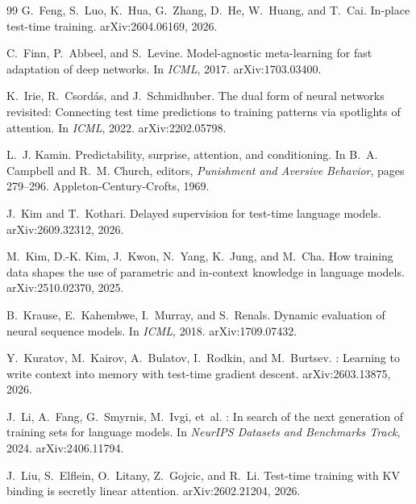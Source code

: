 \documentclass[11pt]{article}
\begin{document}
\begin{thebibliography}{99}
G.~Feng, S.~Luo, K.~Hua, G.~Zhang, D.~He, W.~Huang, and T.~Cai.
\newblock In-place test-time training.
\newblock arXiv:2604.06169, 2026.

C.~Finn, P.~Abbeel, and S.~Levine.
\newblock Model-agnostic meta-learning for fast adaptation of deep networks.
\newblock In \emph{ICML}, 2017. arXiv:1703.03400.

K.~Irie, R.~Csord{\'a}s, and J.~Schmidhuber.
\newblock The dual form of neural networks revisited: Connecting test time predictions to training
  patterns via spotlights of attention.
\newblock In \emph{ICML}, 2022. arXiv:2202.05798.

L.~J. Kamin.
\newblock Predictability, surprise, attention, and conditioning.
\newblock In B.~A. Campbell and R.~M. Church, editors, \emph{Punishment and Aversive Behavior},
  pages 279--296. Appleton-Century-Crofts, 1969.

J.~Kim and T.~Kothari.
\newblock Delayed supervision for test-time language models.
\newblock arXiv:2609.32312, 2026.

M.~Kim, D.-K. Kim, J.~Kwon, N.~Yang, K.~Jung, and M.~Cha.
\newblock How training data shapes the use of parametric and in-context knowledge in language
  models.
\newblock arXiv:2510.02370, 2025.

B.~Krause, E.~Kahembwe, I.~Murray, and S.~Renals.
\newblock Dynamic evaluation of neural sequence models.
\newblock In \emph{ICML}, 2018. arXiv:1709.07432.

Y.~Kuratov, M.~Kairov, A.~Bulatov, I.~Rodkin, and M.~Burtsev.
: Learning to write context into memory with test-time gradient descent.
\newblock arXiv:2603.13875, 2026.

J.~Li, A.~Fang, G.~Smyrnis, M.~Ivgi, et~al.
: In search of the next generation of training sets for language models.
\newblock In \emph{NeurIPS Datasets and Benchmarks Track}, 2024. arXiv:2406.11794.

J.~Liu, S.~Elflein, O.~Litany, Z.~Gojcic, and R.~Li.
\newblock Test-time training with {KV} binding is secretly linear attention.
\newblock arXiv:2602.21204, 2026.


\end{thebibliography}
\end{document}
